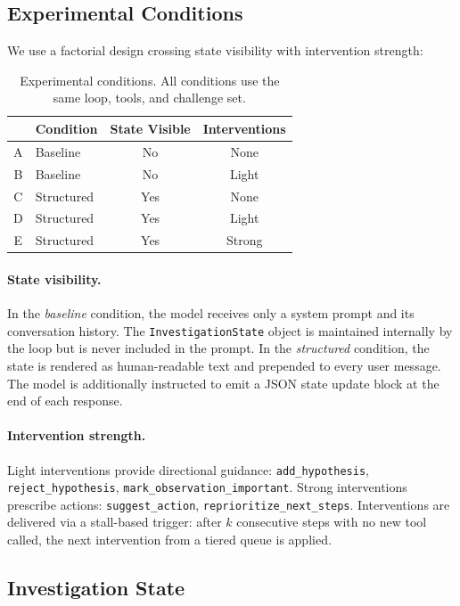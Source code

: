\documentclass[letterpaper]{article}
\begin{document}
\subsection{Experimental Conditions}

We use a factorial design crossing state visibility with intervention strength:

\begin{table}[t]
\centering
\caption{Experimental conditions. All conditions use the same loop, tools, and challenge set.}
\label{tab:conditions}
\begin{tabular}{clcc}
\toprule
 & Condition & State Visible & Interventions \\
\midrule
A & Baseline & No & None \\
B & Baseline & No & Light \\
C & Structured & Yes & None \\
D & Structured & Yes & Light \\
E & Structured & Yes & Strong \\
\bottomrule
\end{tabular}
\end{table}

\paragraph{State visibility.}
In the \emph{baseline} condition, the model receives only a system prompt and its conversation history.
The \texttt{InvestigationState} object is maintained internally by the loop but is never included in the prompt.
In the \emph{structured} condition, the state is rendered as human-readable text and prepended to every user message.
The model is additionally instructed to emit a JSON state update block at the end of each response.

\paragraph{Intervention strength.}
Light interventions provide directional guidance: \texttt{add\_hypothesis}, \texttt{reject\_hypothesis}, \texttt{mark\_observation\_important}.
Strong interventions prescribe actions: \texttt{suggest\_action}, \texttt{reprioritize\_next\_steps}.
Interventions are delivered via a stall-based trigger: after $k$ consecutive steps with no new tool called, the next intervention from a tiered queue is applied.

\subsection{Investigation State}
\end{document}
